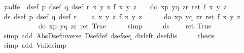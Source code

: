 \begin{isabellebody}
\ yadfe{\isacharcolon}\ {\isachardoublequote}\ {\isasymlbrakk}dsef\ p{\isacharsemicolon}\ dsef\ q{\isacharsemicolon}\ dsef\ r{\isacharsemicolon}\ {\isasymforall}x\ y\ z{\isachardot}\ f\ x\ y\ z{\isasymrbrakk}\ {\isasymLongrightarrow}\ {\isasymturnstile}\ {\isasymUp}\ {\isacharparenleft}do\ {\isacharbraceleft}x{\isasymleftarrow}p{\isacharsemicolon}\ y{\isasymleftarrow}q{\isacharsemicolon}\ z{\isasymleftarrow}r{\isacharsemicolon}\ ret\ {\isacharparenleft}f\ x\ y\ z{\isacharparenright}{\isacharbraceright}{\isacharparenright}{\isachardoublequote}\isanewline
\isamarkupfalse%
\ {\isacharminus}\isanewline
\ \ \isamarkupfalse%
\ ds{\isacharcolon}\ {\isachardoublequote}dsef\ p{\isachardoublequote}\ {\isachardoublequote}dsef\ q{\isachardoublequote}\ {\isachardoublequote}dsef\ r{\isachardoublequote}\isanewline
\ \ \isamarkupfalse%
\ a{}{\isacharcolon}\ {\isachardoublequote}{\isasymforall}x\ y\ z{\isachardot}\ f\ x\ y\ z{\isachardoublequote}\isanewline
\ \ \isamarkupfalse%
\ {\isachardoublequote}{\isasymDown}\ {\isacharparenleft}{\isasymUp}\ {\isacharparenleft}do\ {\isacharbraceleft}x{\isasymleftarrow}p{\isacharsemicolon}\ y{\isasymleftarrow}q{\isacharsemicolon}\ z{\isasymleftarrow}r{\isacharsemicolon}\ ret\ {\isacharparenleft}f\ x\ y\ z{\isacharparenright}{\isacharbraceright}{\isacharparenright}{\isacharparenright}\ {\isacharequal}\ \isanewline
\ \ \ \ \ \ \ \ \ {\isasymDown}\ {\isacharparenleft}{\isasymUp}\ {\isacharparenleft}do\ {\isacharbraceleft}x{\isasymleftarrow}p{\isacharsemicolon}\ y{\isasymleftarrow}q{\isacharsemicolon}\ z{\isasymleftarrow}r{\isacharsemicolon}\ ret\ True{\isacharbraceright}{\isacharparenright}{\isacharparenright}{\isachardoublequote}\isanewline
\ \ \ \ \isamarkupfalse%
\ {\isacharparenleft}simp{\isacharparenright}\isanewline
\ \ \isamarkupfalse%
\ \isamarkupfalse%
\ ds\ \isamarkupfalse%
\ {\isachardoublequote}{\isasymdots}\ {\isacharequal}\ ret\ True{\isachardoublequote}\ \isanewline
\ \ \ \ \isamarkupfalse%
\ {\isacharparenleft}simp\ add{\isacharcolon}\ Abs{\isacharunderscore}Dsef{\isacharunderscore}inverse\ Dsef{\isacharunderscore}def\ dsef{\isacharunderscore}seq\ dis{\isacharunderscore}left{}\ dsef{\isacharunderscore}dis{\isacharparenright}\isanewline
\ \ \isamarkupfalse%
\ \isamarkupfalse%
\ {\isacharquery}thesis\ \isamarkupfalse%
\ {\isacharparenleft}simp\ add{\isacharcolon}\ Valid{\isacharunderscore}simp{\isacharparenright}\isanewline

\end{isabellebody}
